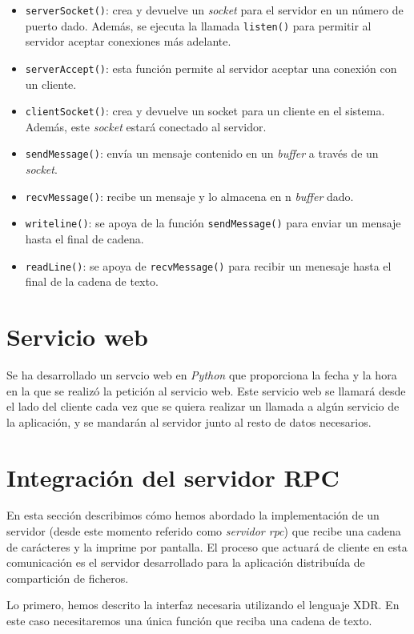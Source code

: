 \documentclass[]{article}
\begin{document}
\begin{itemize}
    \item \texttt{serverSocket()}: crea y devuelve un \textit{socket} para el servidor en un número de puerto dado. Además, se ejecuta la llamada \texttt{listen()} para permitir al servidor aceptar conexiones más adelante. 
    \item \texttt{serverAccept()}: esta función permite al servidor aceptar una conexión con un cliente. 
    \item \texttt{clientSocket()}: crea y devuelve un socket para un cliente en el sistema. Además, este \textit{socket} estará conectado al servidor. 
    \item \texttt{sendMessage()}: envía un mensaje contenido en un \textit{buffer} a través de un \textit{socket}. 
    \item \texttt{recvMessage()}: recibe un mensaje y lo almacena en n \textit{buffer} dado. 
    \item \texttt{writeline()}: se apoya de la función \texttt{sendMessage()} para enviar un mensaje hasta el final de cadena.
    \item \texttt{readLine()}: se apoya de \texttt{recvMessage()} para recibir un menesaje hasta el final de la cadena de texto.
\end{itemize}

\section{Servicio web}
\label{sec:web_service}
Se ha desarrollado un servcio web en \textit{Python} que proporciona la fecha y la hora en la que se realizó la petición al servicio web.
Este servicio web se llamará desde el lado del cliente cada vez que se quiera realizar un llamada a algún servicio de la aplicación, y se mandarán al servidor junto al resto de datos necesarios.

\section{Integración del servidor RPC}
\label{sec:rpc}
En esta sección describimos cómo hemos abordado la implementación de un servidor (desde este momento referido como \textit{servidor rpc}) que recibe una cadena de carácteres y la imprime por pantalla. El proceso que actuará de cliente en esta comunicación es el servidor desarrollado para la aplicación distribuída de compartición de ficheros. 

Lo primero, hemos descrito la interfaz necesaria utilizando el lenguaje XDR. En este caso necesitaremos una única función que reciba una cadena de texto. 
\end{document}

